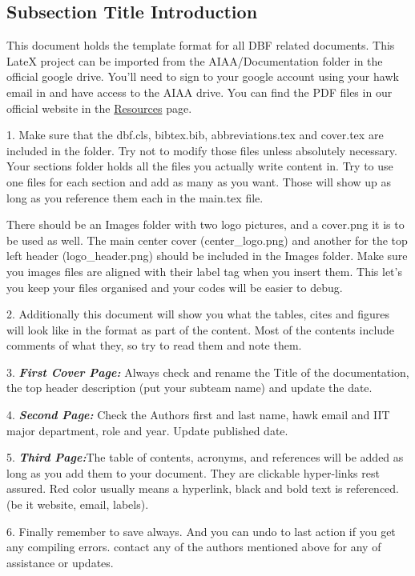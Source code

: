 \subsection{Subsection Title Introduction}
This document holds the template format for all DBF related documents. This LateX project can be imported from the AIAA/Documentation folder in the official google drive. You'll need to sign to your google account using your hawk email in and have access to the AIAA drive. You can find the PDF files in our official website in the \href{https://sites.google.com/iit.edu/aiaaiit/more/resources?authuser=0}{Resources} page. 

1. Make sure that the dbf.cls, bibtex.bib, abbreviations.tex and  cover.tex are included in the folder. Try not to modify those files unless absolutely necessary. Your sections folder holds all the files you actually write content in. Try to use one files for each section and add as many as you want. Those will show up as long as you reference them each in the main.tex file. 

There should be an Images folder with two logo pictures, and a cover.png it is to be used as well. The main center cover (center\_logo.png) and another for the top left header (logo\_header.png) should be included in the Images folder. Make sure you images files are aligned with their label tag when you insert them. This let's you keep your files organised and your codes will be easier to debug. 

2. Additionally this document will show you what the tables, cites and figures will look like in the format as part of the content. Most of the contents include comments of what they, so try to read them and note them.  

3. \textit{\textbf{First Cover Page:}} Always check and rename the Title of the documentation, the top header description (put your subteam name) and update the date. 

4. \textit{\textbf{Second Page:}} Check the Authors first and last name, hawk email and IIT major department, role and year. Update published date.

5. \textit{\textbf{Third Page:}}The table of contents, acronyms, and references will be added as long as you add them to your document. They are clickable hyper-links rest assured. Red color usually means a hyperlink, black and bold text is referenced. (be it website, email, labels).

6. Finally remember to save always. And you can undo to last action if you get any compiling errors. contact any of the authors mentioned above for any of assistance or updates. 

